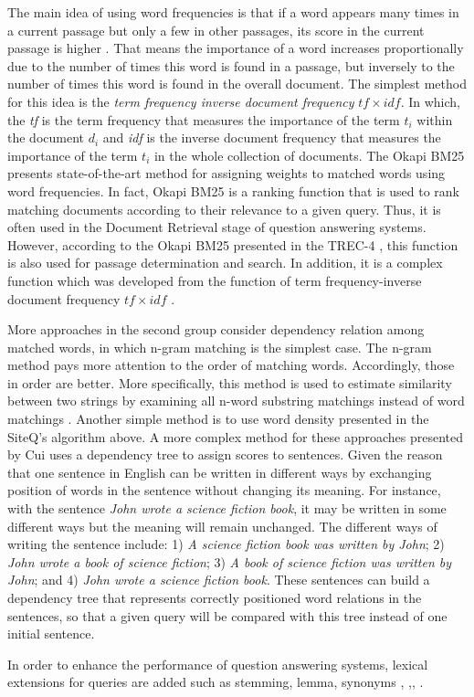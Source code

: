 The main idea of using word frequencies is that if a word appears many times in a current passage but only a few in other passages, its score in the current passage is higher \cite{robertson2004uid}. That means the importance of a word increases proportionally due to the number of times this word is found in a passage, but inversely to the number of times this word is found in the overall document. The simplest method for this idea is the \textit{term frequency inverse document frequency} \textit{\ensuremath{tf\times idf}}. In which, the \textit{tf} is the term frequency that measures the importance of the term \textit{\ensuremath{t_{i}}} within the document \textit{\ensuremath{d_{i}}} and \textit{idf} is the inverse document frequency that measures the importance of the term \textit{\ensuremath{t_{i}}} in the whole collection of documents. The Okapi BM25 \cite{robertson1996ot, beaulieu1995ot, xue2008rmq, comas2008sdr, tellex2003qep} presents state-of-the-art method for assigning weights to matched words using word frequencies. In fact, Okapi BM25 is a ranking function that is used to rank matching documents according to their relevance to a given query. Thus, it is often used in the Document Retrieval stage of question answering systems. However, according to the Okapi BM25 presented in the TREC-4 \cite{robertson1996ot}, this function is also used for passage determination and search. In addition, it is a complex function which was developed from the function of term frequency-inverse document frequency \textit{\ensuremath{tf\times idf}} \cite{robertson2004uid}. 

More approaches in the second group consider dependency relation among matched words, in which n-gram matching is the simplest case. The n-gram method pays more attention to the order of matching words. Accordingly, those in order are better. More specifically, this method is used to estimate similarity between two strings by examining all n-word substring matchings instead of word matchings \cite{robertson1998ang}. Another simple method is to use word density presented in the SiteQ's algorithm above. A more complex method for these approaches presented by Cui \cite{cui2005qap} uses a dependency tree to assign scores to sentences. Given the reason that one sentence in English can be written in different ways by exchanging position of words in the sentence without changing its meaning. For instance, with the sentence \textit{John wrote a science fiction book}, it may be written in some different ways but the meaning will remain unchanged. The different ways of writing the sentence include: 1)  \textit{A science fiction book was written by John}; 2) \textit{John wrote a book of science fiction}; 3) \textit{A book of science fiction was written by John}; and 4) \textit{John wrote a science fiction book}. These sentences can build a dependency tree that represents correctly positioned word relations in the sentences, so that a given query will be compared with this tree instead of one initial sentence.
 
In order to enhance the performance of question answering systems, lexical extensions for queries are added such as stemming, lemma, synonyms \cite{light2002aec}, \cite{tellex2003pmf},\cite{bilotti2004wbq}, \cite{lee2002seh}.

